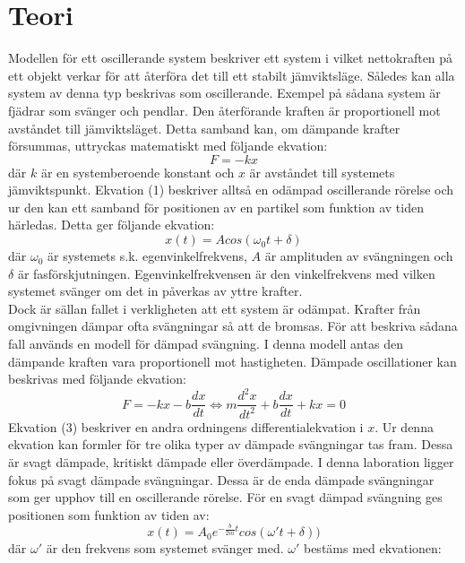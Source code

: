 \documentclass[a4paper,10pt]{article}
\begin{document}
\section{Teori}
Modellen för ett oscillerande system beskriver ett system i vilket nettokraften på ett objekt verkar för att återföra det till ett stabilt jämviktsläge. Således kan alla system av denna typ beskrivas som oscillerande. Exempel på sådana system är fjädrar som svänger och pendlar. Den återförande kraften är proportionell mot avståndet till jämviktsläget. Detta samband kan, om dämpande krafter försummas, uttryckas matematiskt med följande ekvation:
\begin{equation}
	F = -kx
\end{equation}
där $k$ är en systemberoende konstant och $x$ är avståndet till systemets jämviktspunkt. Ekvation (1) beskriver alltså en odämpad oscillerande rörelse och ur den kan ett samband för positionen av en partikel som funktion av tiden härledas. Detta ger följande ekvation:
\begin{equation}
	x(t) = A cos(\omega_0t + \delta)
\end{equation}
där $\omega_0$ är systemets s.k. egenvinkelfrekvens, $A$ är amplituden av svängningen och $\delta$ är fasförskjutningen. Egenvinkelfrekvensen är den vinkelfrekvens med vilken systemet svänger om det in påverkas av yttre krafter. \\
\indent Dock är sällan fallet i verkligheten att ett system är odämpat. Krafter från omgivningen dämpar ofta svängningar så att de bromsas. För att beskriva sådana fall används en modell för dämpad svängning. I denna modell antas den dämpande kraften vara proportionell mot hastigheten. Dämpade oscillationer kan beskrivas med följande ekvation:
\begin{equation}
	F = -kx - b\frac{dx}{dt} \Longleftrightarrow m\frac{d^2x}{dt^2} + b\frac{dx}{dt} + kx = 0
\end{equation}
Ekvation (3) beskriver en andra ordningens differentialekvation i $x$. Ur denna ekvation kan formler för tre olika typer av dämpade svängningar tas fram. Dessa är svagt dämpade, kritiskt dämpade eller överdämpade. I denna laboration ligger fokus på svagt dämpade svängningar. Dessa är de enda dämpade svängningar som ger upphov till en oscillerande rörelse. För en svagt dämpad svängning ges positionen som funktion av tiden av:
\begin{equation}
	x(t) = A_0e^{-\frac{b}{2m}t}cos(\omega't + \delta))
\end{equation}
där $\omega'$ är den frekvens som systemet svänger med. $\omega'$ bestäms med ekvationen:
\end{document}
